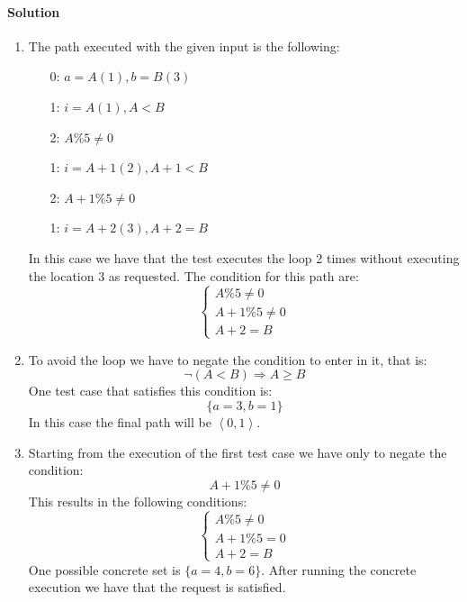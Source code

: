 \paragraph*{Solution}
\begin{enumerate}
    \item The path executed with the given input is the following: 
        \begin{enumerate}
            \item [0: ] $a=A(1), b=B(3)$
            \item [1: ] $i=A(1), A<B$
            \item [2: ] $A\%5 \neq 0$
            \item [1: ] $i = A+1(2), A+1<B$
            \item [2: ] $A+1\%5 \neq 0$
            \item [1: ] $i=A+2(3), A+2=B$
        \end{enumerate}
        In this case we have that the test executes the loop 2 times without executing the location 3 as requested. 
        The condition for this path are: 
        \[\begin{cases}
            A\%5 \neq 0 \\ A+1\%5 \neq 0 \\ A+2=B
        \end{cases}\]
    \item To avoid the loop we have to negate the condition to enter in it, that is: 
        \[\neg( A < B ) \Rightarrow A \geq B\]
        One test case that satisfies this condition is: 
        \[\{a=3,b=1\}\]
        In this case the final path will be $\left\langle 0,1 \right\rangle$. 
    \item Starting from the execution of the first test case we have only to negate the condition: 
        \[A+1\%5 \neq 0\]
        This results in the following conditions: 
        \[\begin{cases}
            A\%5 \neq 0 \\ A+1\%5 = 0 \\ A+2=B
        \end{cases}\]  
        One possible concrete set is $\{a = 4, b = 6\}$. 
        After running the concrete execution we have that the request is satisfied. 
\end{enumerate}